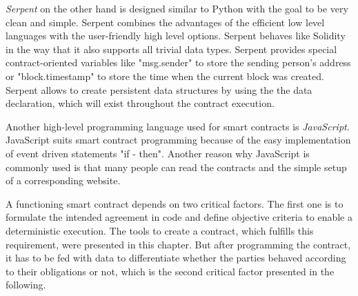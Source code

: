 \documentclass[conference]{IEEEtran}
\begin{document}
\textit{Serpent} on the other hand is designed similar to Python with the goal to be very clean and simple. Serpent combines the advantages of the efficient low level languages with the user-friendly high level options. Serpent behaves like Solidity in the way that it also supports all trivial data types. Serpent provides special contract-oriented variables like "msg.sender" to store the sending person's address or "block.timestamp" to store the time when the current block was created. Serpent allows to create persistent data structures by using the the data declaration, which will exist throughout the contract execution. \cite{McAdams2017} \cite{Arnett2015} \par 
Another high-level programming language used for smart contracts is \textit{JavaScript}. JavaScript suits smart contract programming because of the easy implementation of event driven statements "if - then". Another reason why JavaScript is commonly used is that many people can read the contracts and the simple setup of a corresponding website. \cite{bitquant2016} \par 
A functioning smart contract depends on two critical factors. The first one is to formulate the intended agreement in code and define objective criteria to enable a deterministic execution. The tools to create a contract, which fulfills this requirement, were presented in this chapter. But after programming the contract, it has to be fed with data to differentiate whether the parties behaved according to their obligations or not, which is the second critical factor presented in the following. 
\end{document}
